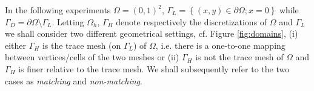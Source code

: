 \documentclass[r]{siamart171218}
\begin{document}
%

In the following experiments $\Omega=(0, 1)^2$, $\Gamma_L=\left\{(x, y)\in\partial\Omega; x=0\right\}$
while $\Gamma_D=\partial\Omega\setminus \Gamma_L$. Letting $\Omega_h$, $\Gamma_H$
denote respectively the discretizations of $\Omega$ and $\Gamma_L$ we shall consider
two different geometrical settings, cf. Figure \ref{fig:domains}, (i) either
$\Gamma_H$ is the trace mesh (on $\Gamma_L$) of $\Omega$, i.e. there is a one-to-one
mapping between vertices/cells of the two meshes or (ii) $\Gamma_H$ is not the
trace mesh of $\Omega$ and $\Gamma_H$ is finer relative to the trace mesh.
We shall subsequently refer to the two cases as \emph{matching} and \emph{non-matching}.
\end{document}

